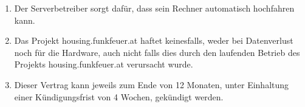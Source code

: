 \documentclass[parskip=half]{scrreprt}
\begin{document}
\begin{contract}
\begin{enumerate}
\item Der Serverbetreiber sorgt dafür, dass sein Rechner automatisch hochfahren kann.
\item Das Projekt housing.funkfeuer.at haftet keinesfalls, weder bei Datenverlust noch für die Hardware, auch nicht falls dies durch den laufenden Betrieb des Projekts housing.funkfeuer.at verursacht wurde.
\item Dieser Vertrag kann jeweils zum Ende von 12 Monaten, unter Einhaltung einer Kündigungsfrist von 4 Wochen, gekündigt werden.
\end{enumerate}
\end{contract}




\end{document}

